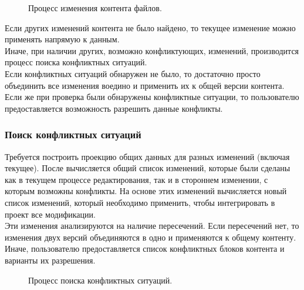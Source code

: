 \documentclass[a4paper,14pt]{extreport} %
\begin{document}
\begin{figure}[H]
\caption{Процесс изменения контента файлов.}
\label{update-file-content-process}
\end{figure}

Если других изменений контента не было найдено, то текущее изменение можно применять напрямую к данным. \\
Иначе, при наличии других, возможно конфликтующих, изменений, производится процесс поиска конфликтных ситуаций. \\
Если конфликтных ситуаций обнаружен не было, то достаточно просто объединить все изменения воедино и применить их к общей версии контента. \\
Если же при проверка были обнаружены конфликтные ситуации, то пользователю предоставляется возможность разрешить данные конфликты.

\newpage
\subsubsection{Поиск конфликтных ситуаций}

Требуется построить проекцию общих данных для разных изменений (включая текущее). После вычисляется общий список изменений, которые были сделаны как в текущем процессе редактирования, так и в стороннем изменении, с которым возможны конфликты. На основе этих изменений вычисляется новый список изменений, который необходимо применить, чтобы интегрировать в проект все модификации. \\
Эти изменения анализируются на наличие пересечений. Если пересечений нет, то изменения двух версий объединяются в одно и применяются к общему контенту. Иначе, пользователю предоставляется список конфликтных блоков контента и варианты их разрешения.

\begin{figure}[H]
\caption{Процесс поиска конфликтных ситуаций.}
\label{check-conflicts-process}
\end{figure}
\end{document}
